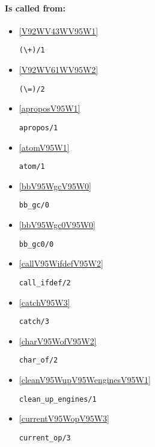 \paragraph{Is called from:} 
\begin{itemize}
\item \ref{V92WV43WV95W1} 
\begin{verbatim}
(\+)/1
\end{verbatim}

\item \ref{V92WV61WV95W2} 
\begin{verbatim}
(\=)/2
\end{verbatim}

\item \ref{aproposV95W1} 
\begin{verbatim}
apropos/1
\end{verbatim}

\item \ref{atomV95W1} 
\begin{verbatim}
atom/1
\end{verbatim}

\item \ref{bbV95WgcV95W0} 
\begin{verbatim}
bb_gc/0
\end{verbatim}

\item \ref{bbV95Wgc0V95W0} 
\begin{verbatim}
bb_gc0/0
\end{verbatim}

\item \ref{callV95WifdefV95W2} 
\begin{verbatim}
call_ifdef/2
\end{verbatim}

\item \ref{catchV95W3} 
\begin{verbatim}
catch/3
\end{verbatim}

\item \ref{charV95WofV95W2} 
\begin{verbatim}
char_of/2
\end{verbatim}

\item \ref{cleanV95WupV95WenginesV95W1} 
\begin{verbatim}
clean_up_engines/1
\end{verbatim}

\item \ref{currentV95WopV95W3} 
\begin{verbatim}
current_op/3
\end{verbatim}


\end{itemize}
